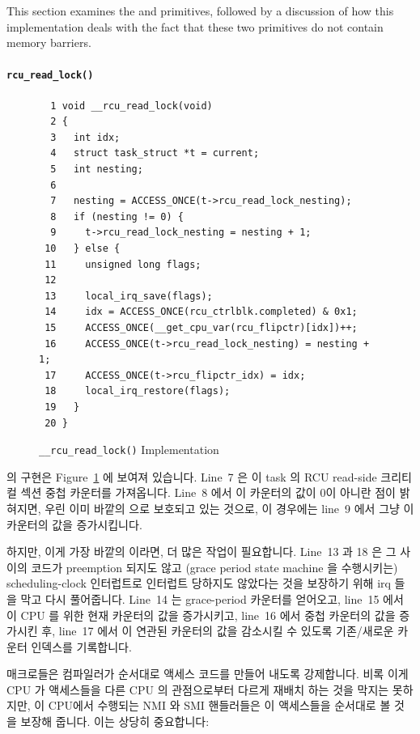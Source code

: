 This section examines the  and
 primitives, followed by a
discussion of how this implementation deals with the fact
that these two primitives do not contain memory barriers.
\fi

\paragraph{{\tt rcu\_read\_lock()}}
\label{app:rcuimpl:rcu_read_lock()}

\begin{figure}[tbp]
{ \scriptsize
\begin{verbatim}
  1 void __rcu_read_lock(void)
  2 {
  3   int idx;
  4   struct task_struct *t = current;
  5   int nesting;
  6
  7   nesting = ACCESS_ONCE(t->rcu_read_lock_nesting);
  8   if (nesting != 0) {
  9     t->rcu_read_lock_nesting = nesting + 1;
 10   } else {
 11     unsigned long flags;
 12
 13     local_irq_save(flags);
 14     idx = ACCESS_ONCE(rcu_ctrlblk.completed) & 0x1;
 15     ACCESS_ONCE(__get_cpu_var(rcu_flipctr)[idx])++;
 16     ACCESS_ONCE(t->rcu_read_lock_nesting) = nesting + 1;
 17     ACCESS_ONCE(t->rcu_flipctr_idx) = idx;
 18     local_irq_restore(flags);
 19   }
 20 }
\end{verbatim}
}
\caption{{\tt \_\_rcu\_read\_lock()} Implementation}
\label{fig:app:rcuimpl:__rcu_read_lock() Implementation}
\end{figure}

 의 구현은
Figure~\ref{fig:app:rcuimpl:__rcu_read_lock() Implementation}
에 보여져 있습니다.
Line~7 은 이 task 의 RCU read-side 크리티컬 섹션 중첩 카운터를 가져옵니다.
Line~8 에서 이 카운터의 값이 0이 아니란 점이 밝혀지면, 우린 이미 바깥의
 으로 보호되고 있는 것으로, 이 경우에는 line~9 에서 그냥 이
카운터의 값을 증가시킵니다.

하지만, 이게 가장 바깥의  이라면, 더 많은 작업이
필요합니다.
Line~13 과 18 은 그 사이의 코드가 preemption 되지도 않고 (grace period state
machine 을 수행시키는) scheduling-clock 인터럽트로 인터럽트 당하지도 않았다는
것을 보장하기 위해 irq 들을 막고 다시 풀어줍니다.
Line~14 는 grace-period 카운터를 얻어오고, line~15 에서 이 CPU 를 위한 현재
카운터의 값을 증가시키고, line~16 에서 중첩 카운터의 값을 증가시킨 후, line~17
에서  이 연관된 카운터의 값을 감소시킬 수 있도록
기존/새로운 카운터 인덱스를 기록합니다.

 매크로들은 컴파일러가 순서대로 액세스 코드를 만들어 내도록
강제합니다.
비록 이게 CPU 가 액세스들을 다른 CPU 의 관점으로부터 다르게 재배치 하는 것을
막지는 못하지만, 이 CPU에서 수행되는 NMI 와 SMI 핸들러들은 이 액세스들을
순서대로 볼 것을 보장해 줍니다.
이는 상당히 중요합니다:
\iffalse

